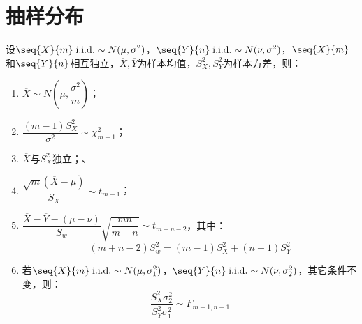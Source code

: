 \section{抽样分布}

\begin{theorem}
	设$\seq{X}{m}\;\text{i.i.d.}\sim N(\mu,\sigma^2)$，$\seq{Y}{n}\;\text{i.i.d.}\sim N(\nu,\sigma^2)$，$\seq{X}{m}$和$\seq{Y}{n}$相互独立，$\overline{X},\overline{Y}$为样本均值，$S_X^2,S_Y^2$为样本方差，则：
	\begin{enumerate}
		\item $\overline{X}\sim N\left(\mu,\dfrac{\sigma^2}{m}\right)$；
		\item $\dfrac{(m-1)S_X^2}{\sigma^2}\sim\chi_{m-1}^2$；
		\item $\overline{X}$与$S_X^2$独立；、
		\item $\dfrac{\sqrt{m}(\overline{X}-\mu)}{S_X}\sim t_{m-1}$；
		\item $\dfrac{\overline{X}-\overline{Y}-(\mu-\nu)}{S_w}\sqrt{\dfrac{mn}{m+n}}\sim t_{m+n-2}$，其中：
		\begin{equation*}
			(m+n-2)S_w^2=(m-1)S_X^2+(n-1)S_Y^2
		\end{equation*}
		\item 若$\seq{X}{m}\;\text{i.i.d.}\sim N(\mu,\sigma_1^2)$，$\seq{Y}{n}\;\text{i.i.d.}\sim N(\nu,\sigma_2^2)$，其它条件不变，则：
		\begin{equation*}
			\frac{S_X^2\sigma_2^2}{S_Y^2\sigma_1^2}\sim F_{m-1,n-1}
		\end{equation*}
	\end{enumerate}
\end{theorem}

